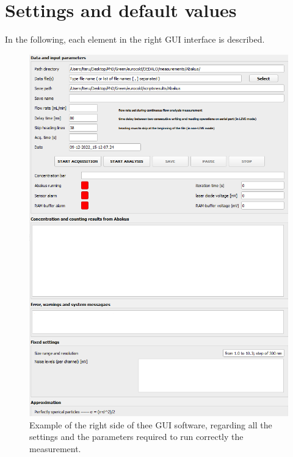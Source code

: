 \documentclass[a4paper, 11pt]{report}
\begin{document}
\section{Settings and default values}
\label{settings_sect}
In the following, each element in the right GUI interface is described.
\begin{figure}[!hp]
	\centering
	\includegraphics[scale=0.73]{setting_section.png}
	\caption{Example of the right side of thee GUI software, regarding all the settings and the parameters required to run correctly the measurement.}
	\label{setting_window}
\end{figure}
\end{document}
